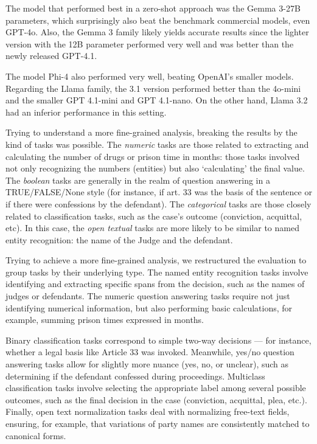 \documentclass[
  12pt,
]{article}
\begin{document}
The model that performed best in a zero-shot approach was the Gemma
3-27B parameters, which surprisingly also beat the benchmark commercial
models, even GPT-4o. Also, the Gemma 3 family likely yields accurate
results since the lighter version with the 12B parameter performed very
well and was better than the newly released GPT-4.1.

The model Phi-4 also performed very well, beating OpenAI's smaller
models. Regarding the Llama family, the 3.1 version performed better
than the 4o-mini and the smaller GPT 4.1-mini and GPT 4.1-nano. On the
other hand, Llama 3.2 had an inferior performance in this setting.

Trying to understand a more fine-grained analysis, breaking the results
by the kind of tasks was possible. The \emph{numeric} tasks are those
related to extracting and calculating the number of drugs or prison time
in months: those tasks involved not only recognizing the numbers
(entities) but also `calculating' the final value. The \emph{boolean}
tasks are generally in the realm of question answering in a
TRUE/FALSE/None style (for instance, if art. 33 was the basis of the
sentence or if there were confessions by the defendant). The
\emph{categorical} tasks are those closely related to classification
tasks, such as the case's outcome (conviction, acquittal, etc). In this
case, the \emph{open textual} tasks are more likely to be similar to
named entity recognition: the name of the Judge and the defendant.

Trying to achieve a more fine-grained analysis, we restructured the
evaluation to group tasks by their underlying type. The named entity
recognition tasks involve identifying and extracting specific spans from
the decision, such as the names of judges or defendants. The numeric
question answering tasks require not just identifying numerical
information, but also performing basic calculations, for example,
summing prison times expressed in months.

Binary classification tasks correspond to simple two-way decisions ---
for instance, whether a legal basis like Article 33 was invoked.
Meanwhile, yes/no question answering tasks allow for slightly more
nuance (yes, no, or unclear), such as determining if the defendant
confessed during proceedings. Multiclass classification tasks involve
selecting the appropriate label among several possible outcomes, such as
the final decision in the case (conviction, acquittal, plea, etc.).
Finally, open text normalization tasks deal with normalizing free-text
fields, ensuring, for example, that variations of party names are
consistently matched to canonical forms.
\end{document}
